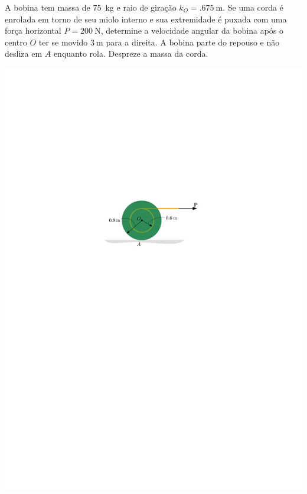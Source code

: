 \item A bobina tem massa de \SI{75}{\kilogram} e raio de giração $k_{O}=\SI{.675}{\meter}$. Se uma corda é enrolada em torno de seu miolo interno e sua extremidade é puxada com uma força horizontal $P=\SI{200}{\newton}$, determine a velocidade angular da bobina após o centro $O$ ter se movido $\SI{3}{\meter}$ para a direita. A bobina parte do repouso e não desliza em $A$ enquanto rola. Despreze a massa da corda.

\begin{flushright}
	\includegraphics[scale=1.2]{../../images/draw_2_1}
\end{flushright}